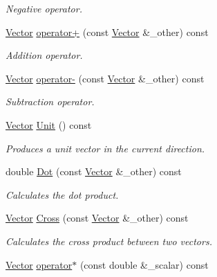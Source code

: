 \begin{DoxyCompactItemize}
\begin{DoxyCompactList}\small\item\em Negative operator. \end{DoxyCompactList}\item 
\hyperlink{classosse_1_1collaborate_1_1_vector}{Vector} \hyperlink{classosse_1_1collaborate_1_1_vector_aab7a37d0c9d6af906635510b15063cac}{operator+} (const \hyperlink{classosse_1_1collaborate_1_1_vector}{Vector} \&\+\_\+other) const
\begin{DoxyCompactList}\small\item\em Addition operator. \end{DoxyCompactList}\item 
\hyperlink{classosse_1_1collaborate_1_1_vector}{Vector} \hyperlink{classosse_1_1collaborate_1_1_vector_a1481fdc0bedbb74a453b75f63599e35a}{operator-\/} (const \hyperlink{classosse_1_1collaborate_1_1_vector}{Vector} \&\+\_\+other) const
\begin{DoxyCompactList}\small\item\em Subtraction operator. \end{DoxyCompactList}\item 
\hyperlink{classosse_1_1collaborate_1_1_vector}{Vector} \hyperlink{classosse_1_1collaborate_1_1_vector_a1067b0871f08bdca0c1021b3763adc80}{Unit} () const
\begin{DoxyCompactList}\small\item\em Produces a unit vector in the current direction. \end{DoxyCompactList}\item 
double \hyperlink{classosse_1_1collaborate_1_1_vector_aa33392d41fcf146180125cc0b6a84efb}{Dot} (const \hyperlink{classosse_1_1collaborate_1_1_vector}{Vector} \&\+\_\+other) const
\begin{DoxyCompactList}\small\item\em Calculates the dot product. \end{DoxyCompactList}\item 
\hyperlink{classosse_1_1collaborate_1_1_vector}{Vector} \hyperlink{classosse_1_1collaborate_1_1_vector_a0bfa8cd492b8664c00b2e750ab13334f}{Cross} (const \hyperlink{classosse_1_1collaborate_1_1_vector}{Vector} \&\+\_\+other) const
\begin{DoxyCompactList}\small\item\em Calculates the cross product between two vectors. \end{DoxyCompactList}\item 
\hyperlink{classosse_1_1collaborate_1_1_vector}{Vector} \hyperlink{classosse_1_1collaborate_1_1_vector_a091294293b9af4b040f8784fa9b74cab}{operator$\ast$} (const double \&\+\_\+scalar) const

\end{DoxyCompactItemize}
